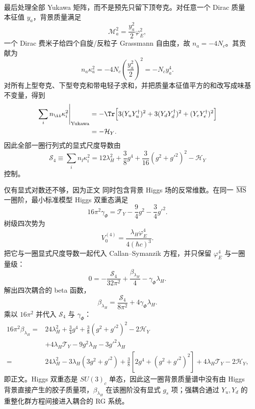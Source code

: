 \begin{derivation}
最后处理全部 Yukawa 矩阵，而不是预先只留下顶夸克。对任意一个 Dirac 质量本征值 $y_a$，背景质量满足
\begin{equation*}
 \mathcal M_a^2=\frac{y_a^2}{2}\varphi_E^2,
\end{equation*}
一个 Dirac 费米子给四个自旋/反粒子 Grassmann 自由度，故 $n_a=-4N_c$。其贡献为
\begin{equation*}
 n_a\kappa_a^2
 =-4N_c\left(\frac{y_a^2}{2}\right)^2
 =-N_cy_a^4.
\end{equation*}
对所有上型夸克、下型夸克和带电轻子求和，并把质量本征值平方的和改写成味基不变量，得到
\begin{align*}
 \left.\sum_i n_\ii\kappa_i^2\right|_{\rm Yukawa}
 &=-\Tr\!\left[3(Y_uY_u^\dagger)^2
 +3(Y_dY_d^\dagger)^2
 +(Y_eY_e^\dagger)^2\right]\\
 &=-\mathcal H_Y.
\end{align*}
因此全部一圈行列式的显式尺度导数由
\begin{equation*}
 \mathcal S_4
 \equiv\sum_i n_\ii\kappa_i^2
 =12\lambda_H^2
 +\frac38g^4
 +\frac{3}{16}(g^2+g'^2)^2
 -\mathcal H_Y
\end{equation*}
控制。

仅有显式对数还不够，因为正文 同时包含背景 Higgs 场的反常维数。在同一 $\overline{\rm MS}$ 一圈阶，最小标准模型 Higgs 双重态满足
\begin{equation*}
 16\pi^2\gamma_\Phi
 =\mathcal T_Y-\frac94g^2-\frac34g'^2.
\end{equation*}
树级四次势为
\begin{equation*}
 V_0^{(4)}
 =\frac{\lambda_H\varphi_E^4}{4(\hbar c)^3}.
\end{equation*}
把它与一圈显式尺度导数一起代入 Callan--Symanzik 方程，并只保留 $\varphi_E^4$ 与一圈量级：
\begin{equation*}
 0
 =-\frac{\mathcal S_4}{32\pi^2}
 +\frac{\beta_{\lambda_H}}4
 -\gamma_\Phi\lambda_H.
\end{equation*}
解出四次耦合的 beta 函数，
\begin{equation*}
 \beta_{\lambda_H}
 =\frac{\mathcal S_4}{8\pi^2}
 +4\gamma_\Phi\lambda_H.
\end{equation*}
乘以 $16\pi^2$ 并代入 $\mathcal S_4$ 与 $\gamma_\Phi$：
\begin{align*}
16\pi^2\beta_{\lambda_H}
={}&24\lambda_H^2
+\frac34g^4
+\frac38(g^2+g'^2)^2
-2\mathcal H_Y\\
&+4\lambda_H\mathcal T_Y
-9g^2\lambda_H-3g'^2\lambda_H\\
={}&24\lambda_H^2
-3\lambda_H(3g^2+g'^2)
+\frac38\left[2g^4+(g^2+g'^2)^2\right]
+4\lambda_H\mathcal T_Y-2\mathcal H_Y,
\end{align*}
即正文。Higgs 双重态是 $SU(3)_c$ 单态，因此这一圈背景质量谱中没有由 Higgs 背景直接产生的胶子质量项，$\beta_{\lambda_H}$ 在该圈阶没有显式 $g_s$ 项；强耦合通过 $Y_u,Y_d$ 的重整化群方程间接进入耦合的 RG 系统。
\end{derivation}

